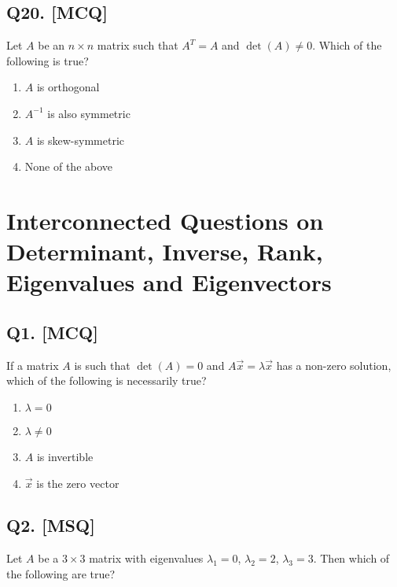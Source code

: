 \subsection*{Q20. [MCQ]}
Let $A$ be an $n \times n$ matrix such that $A^T = A$ and $\det(A) \neq 0$. Which of the following is true?

\begin{enumerate}[label=(\alph*)]
    \item $A$ is orthogonal
    \item $A^{-1}$ is also symmetric
    \item $A$ is skew-symmetric 
    \item None of the above
\end{enumerate}

\section[Interconnected Questions on Determinant, Inverse, Rank, Eigenvalues and Eigenvectors]
{Interconnected Questions on\\ Determinant, Inverse, Rank,\\ Eigenvalues and Eigenvectors}

\subsection*{Q1. [MCQ]}
If a matrix $A$ is such that $\det(A) = 0$ and $A \vec{x} = \lambda \vec{x}$ has a non-zero solution, which of the following is necessarily true?

\begin{enumerate}[label=(\alph*)]
    \item $\lambda = 0$ 
    \item $\lambda \neq 0$
    \item $A$ is invertible
    \item $\vec{x}$ is the zero vector
\end{enumerate}



\subsection*{Q2. [MSQ]}
Let $A$ be a $3 \times 3$ matrix with eigenvalues $\lambda_1 = 0$, $\lambda_2 = 2$, $\lambda_3 = 3$. Then which of the following are true?

